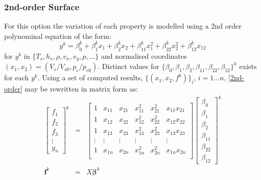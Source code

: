 \subsubsection{2nd-order Surface}
For this option the variation of each property is modelled using a 2nd order polynominal equation of the form:
\begin{equation}
y^k = \beta_0^k + \beta_1^k x_1 + \beta_2^k x_2 + \beta_{11}^k x_1^2 + \beta_{22}^k x_2^2 + \beta_{12}^k x_{12}
\label{2nd-order}
\end{equation}
for $y^k$ in $\lbrace T_s, h_s, \rho, v_x, v_y, p, \dots \rbrace$ and normalised coordinates $(x_1, x_2) = (V_s/V_{s0}, p_e/p_{e0})$. Distinct values for $\lbrace \beta_0, \beta_1, \beta_2, \beta_{11}, \beta_{22}, \beta_{12}\rbrace^k$ exists for each $y^k$. Using a set of computed results, $\lbrace (x_1, x_2, f^k) \rbrace_i$, $i = 1 \dots n$, \cref{2nd-order} may be rewritten in matrix form as:
\begin{eqnarray}
\begin{bmatrix}
f_1 \\ f_2 \\ f_3 \\ \vdots \\ y_n
\end{bmatrix}^k
&=& \begin{bmatrix}
1 & x_{11} & x_{21} & x_{11}^2 & x_{21}^2 & x_{11} x_{21} \\
1 & x_{12} & x_{22} & x_{12}^2 & x_{22}^2 & x_{12} x_{22} \\
1 & x_{13} & x_{23} & x_{13}^2 & x_{23}^2 & x_{13} x_{23} \\
\vdots & \vdots & \vdots & \vdots & \vdots & \vdots \\
1 & x_{1n} & x_{2n} & x_{1n}^2 & x_{2n}^2 & x_{1n} x_{2n} \\
\end{bmatrix}
\begin{bmatrix}
\beta_0 \\ \beta_1 \\ \beta_2 \\ \beta_{11} \\ \beta_{22} \\ \beta_{12}
\end{bmatrix}^k \\
\mathbf{f}^k &=& X \boldsymbol{\beta}^k
\end{eqnarray}
